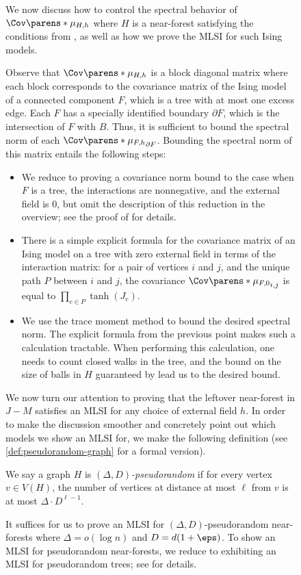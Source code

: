\documentclass[11pt,letterpaper]{article}
\begin{document}
\begin{figure}
We now discuss how to control the spectral behavior of $\Cov\parens*{\mu_{H, h}}$ where $H$ is a near-forest satisfying the conditions from , as well as how we prove the MLSI for such Ising models.

Observe that $\Cov\parens*{\mu_{H,h}}$ is a block diagonal matrix where each block corresponds to the covariance matrix of the Ising model of a connected component $F$, which is a tree with at most one excess edge.
Each $F$ has a specially identified boundary $\partial F$, which is the intersection of $F$ with $B$.
Thus, it is sufficient to bound the spectral norm of each $\Cov\parens*{\mu_{F, h}}_{\partial F}$.
Bounding the spectral norm of this matrix entails the following steps:
\begin{itemize}
    \item We reduce to proving a covariance norm bound to the case when $F$ is a tree, the interactions are nonnegative, and the external field is $0$, but omit the description of this reduction in the overview; see the proof of  for details.
    \item There is a simple explicit formula for the covariance matrix of an Ising model on a tree with zero external field in terms of the interaction matrix: for a pair of vertices $i$ and $j$, and the unique path $P$ between $i$ and $j$, the covariance $\Cov\parens*{\mu_{F,0}}_{i,j}$ is equal to $\prod_{e\in P}\tanh(J_e)$.
    \item We use the trace moment method to bound the desired spectral norm.
    The explicit formula from the previous point makes such a calculation tractable.
    When performing this calculation, one needs to count closed walks in the tree, and the bound on the size of balls in $H$ guaranteed by  lead us to the desired bound.
\end{itemize}

We now turn our attention to proving that the leftover near-forest in $J-M$ satisfies an MLSI for any choice of external field $h$.
In order to make the discussion smoother and concretely point out which models we show an MLSI for, we make the following definition (see \cref{def:pseudorandom-graph} for a formal version).
\begin{definition}
    We say a graph $H$ is \emph{$(\Delta,D)$-pseudorandom} if for every vertex $v\in V(H)$, the number of vertices at distance at most $\ell$ from $v$ is at most $\Delta\cdot D^{\ell-1}$.
\end{definition}
It suffices for us to prove an MLSI for $(\Delta, D)$-pseudorandom near-forests where $\Delta = o(\log n)$ and $D = d(1+\eps)$.
To show an MLSI for pseudorandom near-forests, we reduce to exhibiting an MLSI for pseudorandom trees; see  for details.


\end{figure}
\end{document}
